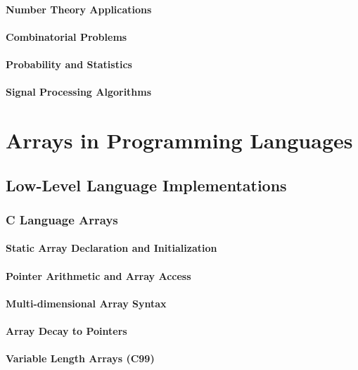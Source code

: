 \documentclass[12pt, oneside]{book}
\begin{document}
\subsubsection{Number Theory Applications}
\subsubsection{Combinatorial Problems}
\subsubsection{Probability and Statistics}
\subsubsection{Signal Processing Algorithms}


\chapter{Arrays in Programming Languages}

\section{Low-Level Language Implementations}
\subsection{C Language Arrays}
\subsubsection{Static Array Declaration and Initialization}
\subsubsection{Pointer Arithmetic and Array Access}
\subsubsection{Multi-dimensional Array Syntax}
\subsubsection{Array Decay to Pointers}
\subsubsection{Variable Length Arrays (C99)}
\end{document}
